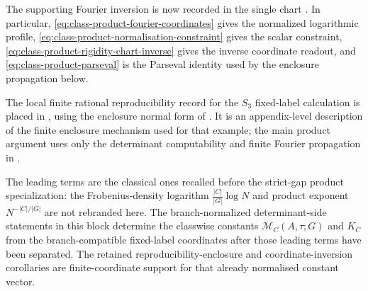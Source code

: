The supporting Fourier inversion is now recorded in the single chart
.  In particular,
\eqref{eq:class-product-fourier-coordinates} gives the normalized logarithmic
profile, \eqref{eq:class-product-normalisation-constraint} gives the scalar
constraint, \eqref{eq:class-product-rigidity-chart-inverse} gives the inverse
coordinate readout, and \eqref{eq:class-product-parseval} is the
Parseval identity used by the enclosure propagation below.

The local finite rational reproducibility record for the \(S_3\) fixed-label
calculation is placed in
, using the enclosure
normal form of .
It is an appendix-level description of the finite enclosure mechanism used for
that example;
the main product argument uses only the determinant computability and finite
Fourier propagation in
.

\begin{remark}
  \label{rem:class-mertens-comparison}
  The leading terms are the classical ones recalled before the strict-gap
  product specialization:
  the Frobenius-density logarithm
  \(\frac{|C|}{|G|}\log N\) and product exponent \(N^{-|C|/|G|}\) are not
  rebranded here.  The branch-normalized determinant-side statements in this
  block determine the classwise constants \(\mathcal M_C(A,\tau;G)\) and
  \(K_C\) from the branch-compatible fixed-label coordinates after those
  leading terms have been separated.  The retained reproducibility-enclosure and coordinate-inversion
  corollaries are finite-coordinate support for that already normalised
  constant vector.
\end{remark}






